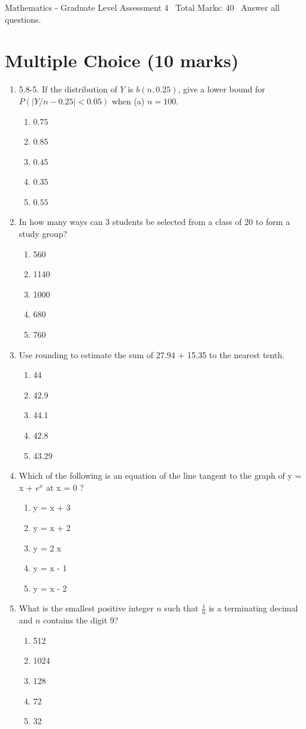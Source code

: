 \documentclass[12pt]{article}
\begin{document}
\begin{center}
Mathematics - Graduate Level Assessment 4 \
Total Marks: 40 \
Answer all questions.
\end{center}

\section*{Multiple Choice (10 marks)}
\begin{enumerate}[label=\arabic*.]
\item 5.8-5. If the distribution of $Y$ is $b(n, 0.25)$, give a lower bound for $P(|Y / n-0.25|<0.05)$ when (a) $n=100$.
\begin{enumerate}[label=(\alph*)]
    \item $0.75$
    \item $0.85$
    \item $0.45$
    \item $0.35$
    \item $0.55$
\end{enumerate}
\item In how many ways can 3 students be selected from a class of 20 to form a study group?
\begin{enumerate}[label=(\alph*)]
    \item 560
    \item 1140
    \item 1000
    \item 680
    \item 760
\end{enumerate}
\item Use rounding to estimate the sum of 27.94 + 15.35 to the nearest tenth.
\begin{enumerate}[label=(\alph*)]
    \item 44
    \item 42.9
    \item 44.1
    \item 42.8
    \item 43.29
\end{enumerate}
\item Which of the following is an equation of the line tangent to the graph of y = x + $e^x$ at x = 0 ?
\begin{enumerate}[label=(\alph*)]
    \item y = x + 3
    \item y = x + 2
    \item y = 2 x
    \item y = x - 1
    \item y = x - 2
\end{enumerate}
\item What is the smallest positive integer $n$ such that $\frac{1}{n}$ is a terminating decimal and $n$ contains the digit 9?
\begin{enumerate}[label=(\alph*)]
    \item 512
    \item 1024
    \item 128
    \item 72
    \item 32
\end{enumerate}
\end{enumerate}
\end{document}

